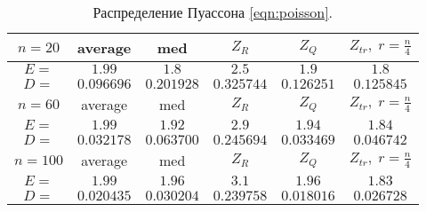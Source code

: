 \documentclass[a4]{article}
\begin{document}
\begin{table}[H]
\caption{\label{tab:poisson} Распределение Пуассона \eqref{eqn:poisson}.}
\begin{center}
\begin{tabular}{|c|c|c|c|c|c|}
\hline
$n = 20$   & average & med & $Z_R$ & $Z_Q$ & $Z_{tr},\;r=\frac{n}{4}$\\ \hline
$E =$     &  	$1.99$    &	$1.8$  &  	$2.5$   & 	$1.9$  &  	$1.8$    \\ \hline
$D =$     &  	$0.096696$    &	$0.201928$    &	$0.325744$   & 	$0.126251$  &  	$0.125845$    \\ \hline
					
$n = 60$   & average & med & $Z_R$ & $Z_Q$ & $Z_{tr},\;r=\frac{n}{4}$\\ \hline
$E =$      & 	$1.99$    &	$1.92$    &	$2.9$   & 	$1.94$    &	$1.84$    \\ \hline
$D =$       &	$0.032178$    &	$0.063700$   & 	$0.245694$   & 	$0.033469$   & 	$0.046742$    \\ \hline
					
$n = 100$   & average & med & $Z_R$ & $Z_Q$ & $Z_{tr},\;r=\frac{n}{4}$\\ \hline
$E =$      & 	$1.99$    &	$1.96$    &	$3.1$  &  	$1.96$   & 	$1.83$    \\ \hline
$D =$      & 	$0.020435$    &	$0.030204$   & 	$0.239758$   & 	$0.018016$  &  	$0.026728$    \\
\hline
\end{tabular}
\end{center}
\end{table}
\end{document}
